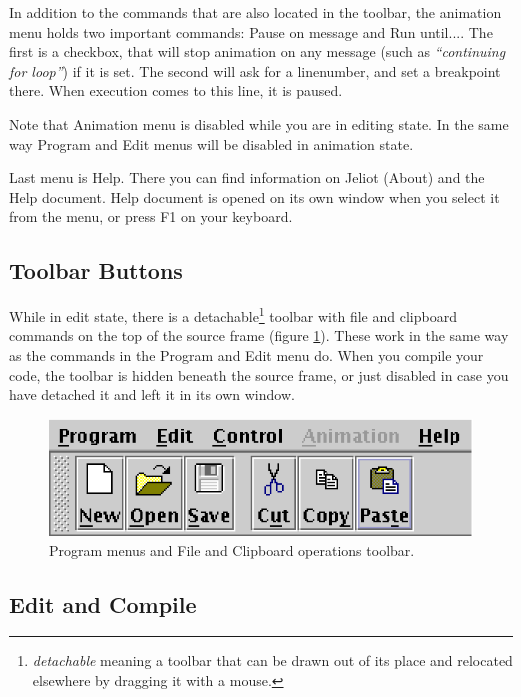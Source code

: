 \documentclass[a4paper,11pt,english]{article}
\newcommand{\jel}{Jeliot}
\newcommand{\bu}[1]{\textsf{#1}}
\newcommand{\menu}{\bu}
\begin{document}
{In addition to the commands that are also located in the toolbar, the \menu{animation} menu holds two important commands: \menu{Pause on message} and \menu{Run until...}. The first is a checkbox, that will stop animation on any message (such as \textit{``continuing for loop''}) if it is set. The second will ask for a linenumber, and set a breakpoint there. When execution comes to this line, it is paused.

Note that \menu{Animation} menu is disabled while you are in editing state. In the same way \menu{Program} and \menu{Edit} menus will be disabled in animation state. 

Last menu is \menu{Help}. There you can find information on \jel{} (\menu{About}) and the \menu{Help} document. Help document is opened on its own window when you select it from the menu, or press \bu{F1} on your keyboard.

\subsection{Toolbar Buttons}
\label{toolbar}

While in edit state, there is a detachable\footnote{\emph{detachable} meaning a toolbar that can be drawn out of its place and relocated elsewhere by dragging it with a mouse.} toolbar with file and clipboard commands on the top of the source frame (figure \ref{fig:menutoolbar}). These work in the same way as the commands in the \menu{Program} and \menu{Edit} menu do. When you compile your code, the toolbar is hidden beneath the source frame, or just disabled in case you have detached it and left it in its own window.

\begin{figure}[ht]
\begin{center}
\includegraphics{images/menu_toolbar.eps}
\caption{\label{fig:menutoolbar}Program menus and File and Clipboard operations toolbar.}
\end{center}
\end{figure}

\subsection{Edit and Compile}
\label{edit_and_compile}

}
\end{document}
